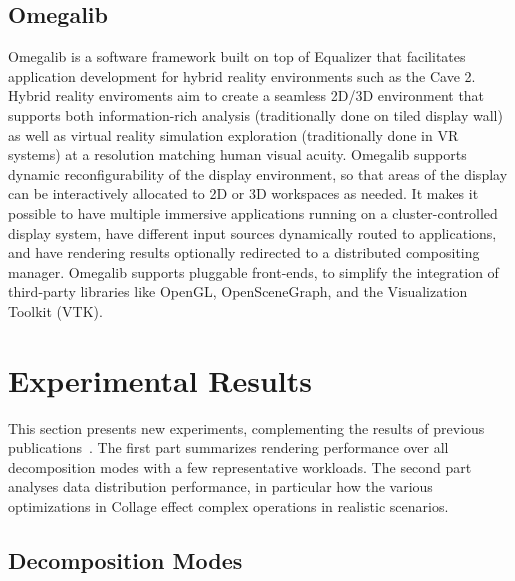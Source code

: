 \documentclass[10pt,journal,compsoc]{IEEEtran}
\begin{document}
\subsection{Omegalib}

Omegalib \cite{Omegalib} is a software framework built on top of Equalizer that
facilitates application development for hybrid reality environments such as the
Cave 2. Hybrid reality enviroments aim to create a seamless 2D/3D environment
that supports both information-rich analysis (traditionally done on tiled
display wall) as well as virtual reality simulation exploration (traditionally
done in VR systems) at a resolution matching human visual acuity. Omegalib
supports dynamic reconfigurability of the display environment, so that areas of
the display can be interactively allocated to 2D or 3D workspaces as needed. It
makes it possible to have multiple immersive applications running on a
cluster-controlled display system, have different input sources dynamically
routed to applications, and have rendering results optionally redirected to a
distributed compositing manager. Omegalib supports pluggable front-ends, to
simplify the integration of third-party libraries like OpenGL, OpenSceneGraph,
and the Visualization Toolkit (VTK).

\section{Experimental Results}\label{sec:results}

This section presents new experiments, complementing the results of previous
publications~\cite{EP:07, EMP:09, MEP:10, EEP:11, EBAHMP:12, HBBES:13, deflect,
  SPEP:16}. The first part summarizes rendering performance over all
decomposition modes with a few representative workloads. The second part
analyses data distribution performance, in particular how the various
optimizations in \textsf{Collage} effect complex operations in realistic
scenarios.

\subsection{Decomposition Modes}

\end{document}
